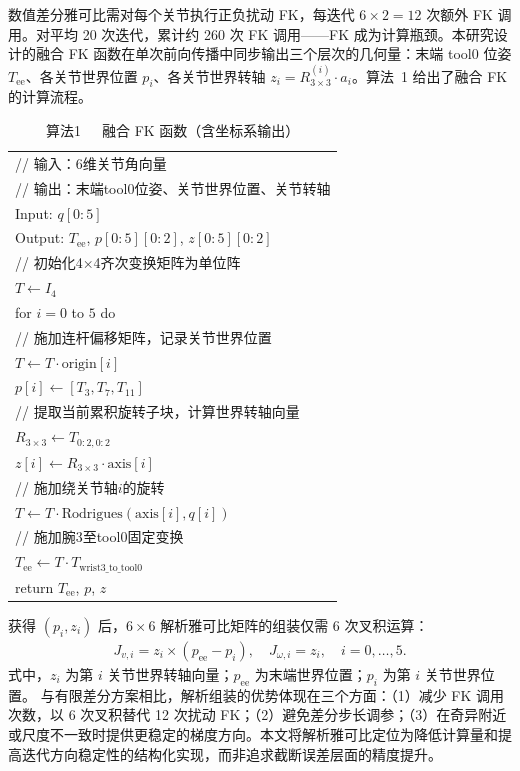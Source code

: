 \documentclass[twocolumn,a4paper,10pt]{ctexart}
\makeatletter
\newenvironment{algotable}[2]{%
  \begin{table}[htbp]
  \centering
  \caption{#2}
  \label{#1}
  \footnotesize\ttfamily
  \begin{tabular}{@{}p{\columnwidth}@{}}
  \toprule
}{%
  \\\bottomrule
  \end{tabular}
  \end{table}
}
\makeatother
\begin{document}
数值差分雅可比需对每个关节执行正负扰动 FK，每迭代 $6\times2=12$ 次额外 FK 调用。对平均 20 次迭代，累计约 260 次 FK 调用——FK 成为计算瓶颈。本研究设计的融合 FK 函数在单次前向传播中同步输出三个层次的几何量：末端 tool0 位姿 $T_{\mathrm{ee}}$、各关节世界位置 $p_i$、各关节世界转轴 $z_i=R_{3\times3}^{(i)}\cdot a_i$。算法~1 给出了融合 FK 的计算流程。

\begin{algotable}{alg:fk}{算法1~~~融合 FK 函数（含坐标系输出）}
// 输入：6维关节角向量\\
// 输出：末端tool0位姿、关节世界位置、关节转轴\\
Input: $q[0{:}5]$\\
Output: $T_{\mathrm{ee}}$, $p[0{:}5][0{:}2]$, $z[0{:}5][0{:}2]$\\[2pt]
// 初始化4×4齐次变换矩阵为单位阵\\
\quad $T\leftarrow I_4$\\
\quad for $i=0$ to $5$ do\\
// 施加连杆偏移矩阵，记录关节世界位置\\
\qquad $T\leftarrow T\cdot\mathrm{origin}[i]$\\
\qquad $p[i]\leftarrow[T_3,T_7,T_{11}]$\\
// 提取当前累积旋转子块，计算世界转轴向量\\
\qquad $R_{3\times3}\leftarrow T_{0:2,0:2}$\\
\qquad $z[i]\leftarrow R_{3\times3}\cdot\mathrm{axis}[i]$\\
// 施加绕关节轴$i$的旋转\\
\qquad $T\leftarrow T\cdot\mathrm{Rodrigues}(\mathrm{axis}[i],q[i])$\\
// 施加腕3至tool0固定变换\\
\quad $T_{\mathrm{ee}}\leftarrow T\cdot T_{\mathrm{wrist3\_to\_tool0}}$\\
\quad return $T_{\mathrm{ee}}$, $p$, $z$
\end{algotable}

获得 $(p_i,z_i)$ 后，$6\times6$ 解析雅可比矩阵的组装仅需 6 次叉积运算\cite{siciliano2010robotics,lynch2017modern}：
\begin{align}
J_{v,i}=z_i\times(p_{\mathrm{ee}}-p_i),\quad J_{\omega,i}=z_i,\quad i=0,\dots,5.
\end{align}
式中，$z_i$ 为第 $i$ 关节世界转轴向量；$p_{\mathrm{ee}}$ 为末端世界位置；$p_i$ 为第 $i$ 关节世界位置。
与有限差分方案相比，解析组装的优势体现在三个方面：（1）减少 FK 调用次数，以 6 次叉积替代 12 次扰动 FK；（2）避免差分步长调参；（3）在奇异附近或尺度不一致时提供更稳定的梯度方向。本文将解析雅可比定位为降低计算量和提高迭代方向稳定性的结构化实现，而非追求截断误差层面的精度提升。
\end{document}

